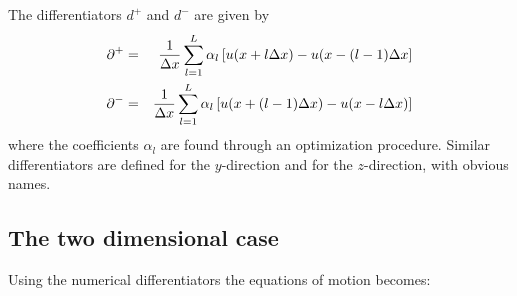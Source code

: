 \documentclass[11pt]{article}
\begin{document}
The differentiators $d^+$ and $d^-$ are given by
\citep{Holberg1987}
%
\begin{eqnarray}
   \mbox{$\partial$}^+ & = & \frac{1}{\Delta x}\sum_{l=1}^L \alpha_l\left[u(x +l\Delta x) -
		          u(x - (l-1)\Delta x\right]\nonumber\\	
   \mbox{$\partial$}^- & = & \frac{1}{\Delta x}\sum_{l=1}^L \alpha_l\left[u(x +(l-1)\Delta x) -
					          u(x - l\Delta x)\right]
\end{eqnarray}
where the coefficients $\alpha_l$ are found through an optimization procedure.
Similar differentiators are defined for the $y$-direction and for 
the $z$-direction, with obvious names.

\subsection{The two dimensional case}
Using the numerical differentiators the equations of motion becomes:
\end{document}
